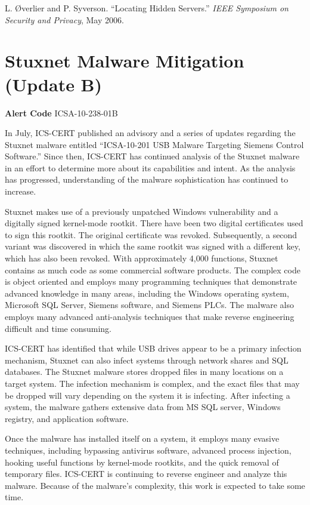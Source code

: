 \documentclass[10pt,twoside,openleft]{memoir}
\begin{document}
\vskip 0.2in 

\noindent L. {\O}verlier and P. Syverson. ``Locating Hidden Servers.'' \textit{IEEE Symposium on Security and Privacy}, May 2006.


\chapter{Stuxnet Malware Mitigation (Update B)}

\textbf{Alert Code} ICSA-10-238-01B

\vskip 0.2in

\noindent In July, ICS-CERT published an advisory and a series of updates regarding the Stuxnet malware entitled ``ICSA-10-201 USB Malware Targeting Siemens Control Software.'' Since then, ICS-CERT has continued analysis of the Stuxnet malware in an effort to determine more about its capabilities and intent. As the analysis has progressed, understanding of the malware sophistication has continued to increase.

Stuxnet makes use of a previously unpatched Windows vulnerability and a digitally signed kernel-mode rootkit. There have been two digital certificates used to sign this rootkit. The original certificate was revoked. Subsequently, a second variant was discovered in which the same rootkit was signed with a different key, which has also been revoked. With approximately 4,000 functions, Stuxnet contains as much code as some commercial software products. The complex code is object oriented and employs many programming techniques that demonstrate advanced knowledge in many areas, including the Windows operating system, Microsoft SQL Server, Siemens software, and Siemens PLCs. The malware also employs many advanced anti-analysis techniques that make reverse engineering difficult and time consuming.

ICS-CERT has identified that while USB drives appear to be a primary infection mechanism, Stuxnet can also infect systems through network shares and SQL databases. The Stuxnet malware stores dropped files in many locations on a target system. The infection mechanism is complex, and the exact files that may be dropped will vary depending on the system it is infecting. After infecting a system, the malware gathers extensive data from MS SQL server, Windows registry, and application software.

Once the malware has installed itself on a system, it employs many evasive techniques, including bypassing antivirus software, advanced process injection, hooking useful functions by kernel-mode rootkits, and the quick removal of temporary files. ICS-CERT is continuing to reverse engineer and analyze this malware. Because of the malware’s complexity, this work is expected to take some time.
\end{document}
